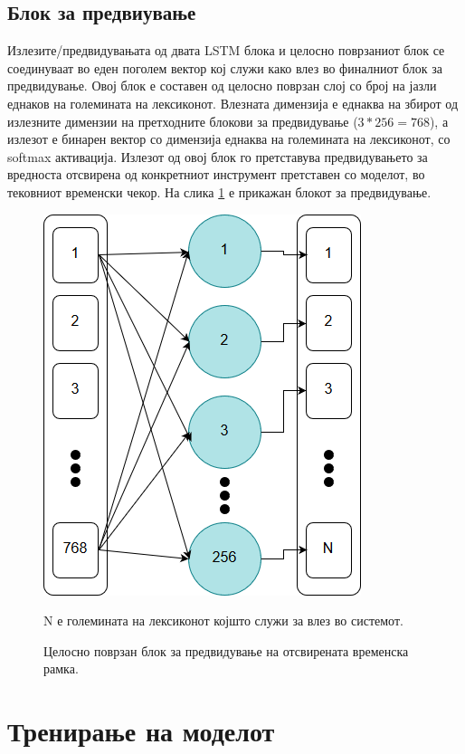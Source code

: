 \subsection{Блок за предвиување}

Излезите/предвидувањата од двата LSTM блока и целосно поврзаниот блок се соединуваат во еден поголем вектор кој служи како влез во финалниот блок за предвидување. Овој блок е составен од целосно поврзан слој со број на јазли еднаков на големината на лексиконот. Влезната димензија е еднаква на збирот од излезните димензии на претходните блокови за предвидување ($3*256=768$), а излезот е бинарен вектор со димензија еднаква на големината на лексиконот, со softmax активација. Излезот од овој блок го претставува предвидувањето за вредноста отсвирена од конкретниот инструмент претставен со моделот, во тековниот временски чекор. На слика \ref{fig:learner} е прикажан блокот за предвидување.

\begin{figure}[H]
	\centering
    \includegraphics[scale=0.5]{images/learner.png}
	\caption{Целосно поврзан блок за предвидување на отсвирената временска рамка.}
	N е големината на лексиконот којшто служи за влез во системот.
	\label{fig:learner}
\end{figure}

\newpage
\section{Тренирање на моделот}


